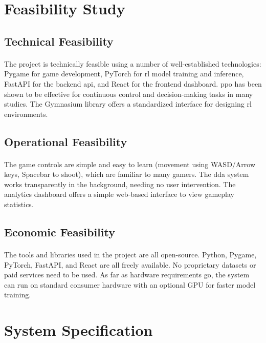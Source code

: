 \section{Feasibility Study}

\subsection{Technical Feasibility}
\paragraph{} The project is technically feasible using a number of well-established technologies: Pygame for game development, PyTorch for \ac{rl} model training and inference, FastAPI for the backend \ac{api}, and React for the frontend dashboard. \ac{ppo} has been shown to be effective for continuous control and decision-making tasks in many studies. The Gymnasium library offers a standardized interface for designing \ac{rl} environments.

\subsection{Operational Feasibility}
\paragraph{} The game controls are simple and easy to learn (movement using WASD/Arrow keys, Spacebar to shoot), which are familiar to many gamers. The \ac{dda} system works transparently in the background, needing no user intervention. The analytics dashboard offers a simple web-based interface to view gameplay statistics.

\subsection{Economic Feasibility}
\paragraph{} The tools and libraries used in the project are all open-source. Python, Pygame, PyTorch, FastAPI, and React are all freely available. No proprietary datasets or paid services need to be used. As far as hardware requirements go, the system can run on standard consumer hardware with an optional GPU for faster model training.

\section{System Specification}

